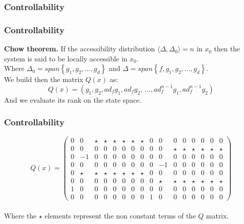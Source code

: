 \subsubsection{Controllability}
\begin{frame}
\frametitle{Controllability}
\textbf{Chow theorem.} If the accessibility distribution $\langle\Delta, \Delta_0\rangle = n$ in $x_0$ then the system is said to be locally accessible in $x_0$.\\
\vspace{.8cm}
Where $\Delta_0 = span\left\{g_1, g_2,..., g_d\right\}$ and $\Delta = span\left\{f, g_1, g_2,..., g_d\right\}$.\\
\vspace{.8cm}
We build then the matrix $Q(x)$ as:
\begin{equation}
	Q(x) = (g_1, g_2, ad_fg_1, ad_fg_2,\,...,ad^{n-1}_fg_1,ad^{n-1}_fg_2)
\end{equation}
And we evaluate its rank on the state space.
\end{frame}
\begin{frame}
\frametitle{Controllability}
\begin{equation*}
	Q(x) =%
	\begin{pmatrix}
		0 &0  &\star &\star &\star &\star &\star &\star &0 &0 &0 &0 &0 &0 &0 &0 \\
		0 &0  &0 &0 &0 &0 &0 &0 &0 &0 &\star &\star &\star &\star &\star &\star \\
		0 &-1 &0 &0 &0 &0 &0 &0 &0 &0 &0 &0 &0 &0 &0 &0 \\
		0 &0  &0 &0 &0 &0 &0 &0 &0 &-1 &0 &0 &0 &0 &0 &0 \\
		0 &\star &\star &\star &\star &\star &\star &\star &0 &0 &0 &0 &0 &0 &0 &0 \\
		0 &0  &0 &0 &0 &0 &0 &0 &0 &\star &\star &\star &\star &\star &\star &\star \\
		1 &0  &0 &0 &0 &0 &0 &0 &0 &0 &0 &0 &0 &0 &0 &0 \\
		0 &0  &0 &0 &0 &0 &0 &0 &1 &0 &0 &0 &0 &0 &0 &0
	\end{pmatrix}
\end{equation*}\\[10pt]
Where the $\star$ elements represent the non constant terms of the $Q$ matrix.
\end{frame}
%
